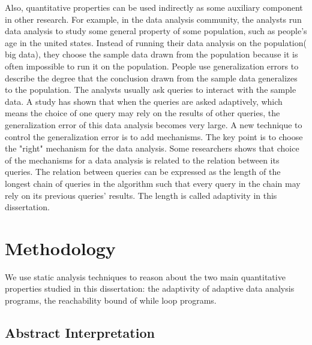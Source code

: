 Also, quantitative properties can be used indirectly as some auxiliary component in other research. {For example, in the data analysis community, the analysts run data analysis to study some general property of some population, such as people's age in the united states. 
Instead of running their data analysis on the population( big data), they choose the sample data drawn from the population because it is often impossible to run it on the population. People use generalization errors to describe the degree that the conclusion drawn from the sample data generalizes to the population. The analysts usually ask queries to interact with the sample data. 
A study has shown that when the queries are asked adaptively, which means the choice of one query may rely on the results of other queries, the generalization error of this data analysis becomes very large. A new technique to control the generalization error is to add mechanisms. 
The key point is to choose the "right" mechanism for the data analysis. Some researchers \citep{DworkFHPRR15, BassilyNSSSU16}
shows that choice of the mechanisms for a data analysis is related to the relation between its queries. 
The relation between queries can be expressed as the length of the longest chain of queries in the algorithm such that every query in the chain may rely on its previous queries' results. The length is called adaptivity in this dissertation.}
\section{Methodology}
We use static analysis techniques to reason about the two main quantitative properties studied in this dissertation: 
the adaptivity of adaptive data analysis programs,
the reachability bound of while loop programs. 

\subsection{Abstract Interpretation}


